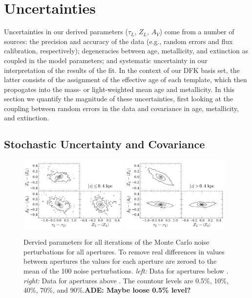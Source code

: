 \section{Uncertainties}
\label{891_2:sec:uncertainty}

Uncertainties in our derived parameters ($\tau_L$, $Z_L$, $A_V$) come
from a number of sources: the precision and accuracy of the data
(e.g., random errors and flux calibration, respectively); degeneracies
between age, metallicity, and extinction as coupled in the model
parameters; and systematic uncertainty in our interpretation of the
results of the fit. In the context of our DFK basis set, the latter
consists of the assignment of the effective age of each template,
which then propogates into the mass- or light-weighted mean age and
metallicity.  In this section we quantify the magnitude of these
uncertainties, first looking at the coupling between random errors in
the data and covariance in age, metallicity, and extinction.
 

\subsection{Stochastic Uncertainty and Covariance}
\label{891_2:sec:fit_err}

\begin{figure}
  \centering
  \includegraphics[width=0.48\textwidth]{891_2/figs/MC_covarcont_below.pdf}
  \includegraphics[width=0.48\textwidth]{891_2/figs/MC_covarcont_above.pdf}
  \caption[Covariance between uncertainties in $\tau_L$, $Z_L$, and
    $A_V$]{\fixspacing\label{891_2:fig:MC_covar}Dervied parameters for
    all iterations of the Monte Carlo noise perturbations for all
    apertures. To remove real differences in values between apertures
    the values for each aperture are zeroed to the mean of the 100
    noise perturbations. \emph{left:} Data for apertures below
    . \emph{right:} Data for apertures above
    . The countour levels are 0.5\%, 10\%, 40\%, 70\%,
    and 90\%.{\bf ADE: Maybe loose 0.5\% level?} }
\end{figure}

